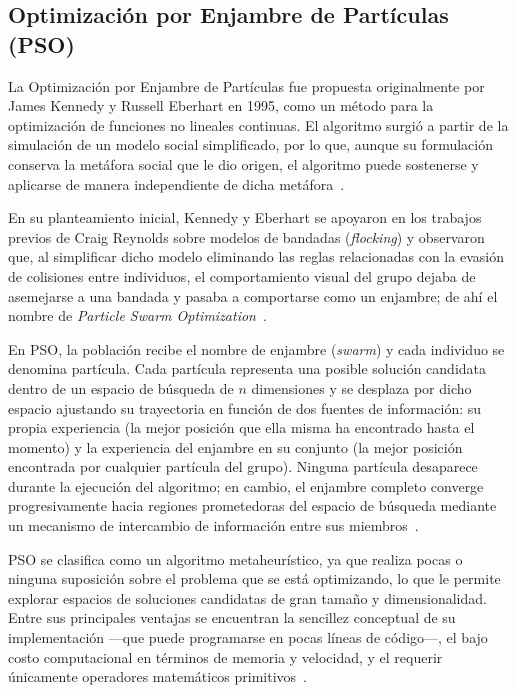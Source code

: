 \subsection{Optimización por Enjambre de Partículas (PSO)}

La Optimización por Enjambre de Partículas fue propuesta originalmente por James Kennedy y Russell Eberhart en 1995, como un método para la optimización de funciones no lineales continuas. El algoritmo surgió a partir de la simulación de un modelo social simplificado, por lo que, aunque su formulación conserva la metáfora social que le dio origen, el algoritmo puede sostenerse y aplicarse de manera independiente de dicha metáfora~\cite{kennedy_particle_nodate}.

En su planteamiento inicial, Kennedy y Eberhart se apoyaron en los trabajos previos de Craig Reynolds sobre modelos de bandadas (\textit{flocking}) y observaron que, al simplificar dicho modelo eliminando las reglas relacionadas con la evasión de colisiones entre individuos, el comportamiento visual del grupo dejaba de asemejarse a una bandada y pasaba a comportarse como un enjambre; de ahí el nombre de \textit{Particle Swarm Optimization}~\cite{collet_stochastic_2007}.

En PSO, la población recibe el nombre de enjambre (\textit{swarm}) y cada individuo se denomina partícula. Cada partícula representa una posible solución candidata dentro de un espacio de búsqueda de $n$ dimensiones y se desplaza por dicho espacio ajustando su trayectoria en función de dos fuentes de información: su propia experiencia (la mejor posición que ella misma ha encontrado hasta el momento) y la experiencia del enjambre en su conjunto (la mejor posición encontrada por cualquier partícula del grupo). Ninguna partícula desaparece durante la ejecución del algoritmo; en cambio, el enjambre completo converge progresivamente hacia regiones prometedoras del espacio de búsqueda mediante un mecanismo de intercambio de información entre sus miembros~\cite{patel_fuzzy_2011}.

PSO se clasifica como un algoritmo metaheurístico, ya que realiza pocas o ninguna suposición sobre el problema que se está optimizando, lo que le permite explorar espacios de soluciones candidatas de gran tamaño y dimensionalidad. Entre sus principales ventajas se encuentran la sencillez conceptual de su implementación ---que puede programarse en pocas líneas de código---, el bajo costo computacional en términos de memoria y velocidad, y el requerir únicamente operadores matemáticos primitivos~\cite{kennedy_particle_nodate}.

